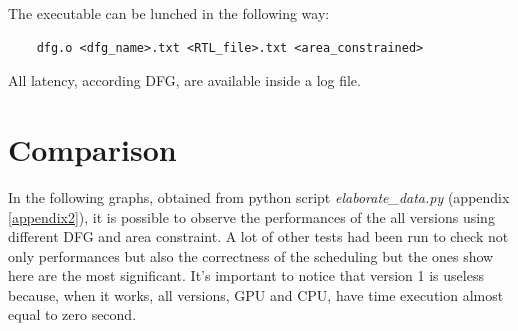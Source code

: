 The executable can be lunched in the following way:

\begin{lstlisting}
    dfg.o <dfg_name>.txt <RTL_file>.txt <area_constrained>
\end{lstlisting}

All latency, according DFG, are available inside a log file.

\section{Comparison}

In the following graphs, obtained from python script \emph{elaborate\_data.py} (appendix \ref{appendix2}),
it is possible to observe the performances of the all versions using different DFG and area constraint.
A lot of other tests had been run to check not only performances but also the correctness of the scheduling
but the ones show here are the most significant.
It's important to notice that version 1 is useless because, when it works, all versions, GPU and CPU,
have time execution almost equal to zero second.

